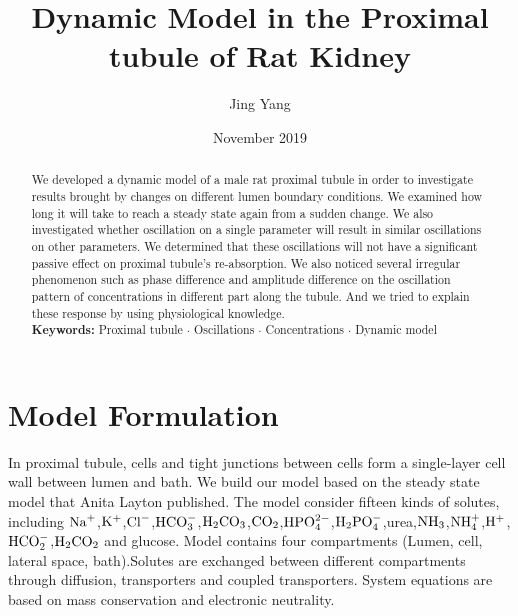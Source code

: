 \documentclass{article}
\title{Dynamic Model in the Proximal tubule of Rat Kidney}
\author{Jing Yang}
\date{November 2019}
\begin{document}
\maketitle

\begin{abstract}
We developed a dynamic model of a male rat proximal tubule in order to investigate results brought by changes on different lumen boundary conditions. We examined how long it will take to reach a steady state again from a sudden change. We also investigated whether oscillation on a single parameter will result in similar oscillations on other parameters. We determined that these oscillations will not have a significant passive effect on proximal tubule's re-absorption. We also noticed several irregular phenomenon such as phase difference and amplitude difference on the oscillation pattern of concentrations in different part along the tubule. And we tried to explain these response by using physiological knowledge.\\

\noindent \textbf{Keywords: }Proximal tubule $\cdot$ Oscillations $\cdot$ Concentrations $\cdot$ Dynamic model
\end{abstract}


\section{Model Formulation}
In proximal tubule, cells and tight junctions between cells form a single-layer cell wall between lumen and bath. We build our model based on the steady state model that Anita Layton published. The model consider fifteen kinds of solutes, including $\rm {Na}^{+}$,$\rm {K}^{+}$,$\rm {Cl}^{-}$,$\rm {HCO}_{3}^{-}$,$\rm H_{2}CO_{3}$,$\rm CO_{2}$,$\rm HPO_{4}^{2-}$,$\rm H_{2}PO_{4}^{-}$,urea,$\rm NH_{3}$,$\rm NH_{4}^{+}$,$\rm H^{+}$,\\$\rm HCO_{2}^{-}$,$\rm H_{2}CO_2$ and glucose. Model contains four compartments (Lumen, cell, lateral space, bath).Solutes are exchanged between different compartments through diffusion, transporters and coupled transporters. System equations are based on mass conservation and electronic neutrality. 
\end{document}

